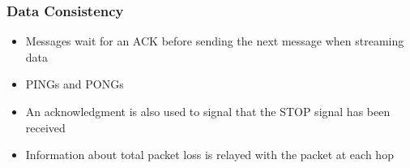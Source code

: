 \begin{frame}
  \frametitle{Data Consistency}

  \begin{itemize}
  \item Messages wait for an ACK before sending the next message when streaming data
  \item PINGs and PONGs
  \item An acknowledgment is also used to signal that the STOP signal has been received
  \item Information about total packet loss is relayed with the packet at each hop
  \end{itemize}
  
\end{frame}
